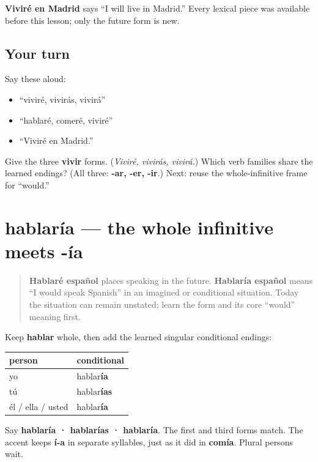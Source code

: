 \begin{grammarlens}[title={Grammar Lens: meaning with known words}]
\textbf{Viviré en Madrid} says “I will live in Madrid.” Every lexical piece was available before this lesson; only the future form is new.
\end{grammarlens}

\subsection*{Your turn}
Say these aloud:

\begin{itemize}
\raggedright
  \item “viviré, vivirás, vivirá”
  \item “hablaré, comeré, viviré”
  \item “Viviré en Madrid.”
\end{itemize}

\begin{tcolorbox}[breakable,colback=teal!4,colframe=teal!35!black,title={Before you move on}]
Give the three \textbf{vivir} forms. (\emph{Viviré, vivirás, vivirá.}) Which verb families share the learned endings? (All three: \textbf{-ar, -er, -ir}.) Next: reuse the whole-infinitive frame for “would.”
\end{tcolorbox}
\section[hablaría]{hablaría — the whole infinitive meets -ía}

\label{lesson:ES-C17-condicional}



\begin{quote}
\textbf{Hablaré español} places speaking in the future. \textbf{Hablaría español} means “I would speak Spanish” in an imagined or conditional situation. Today the situation can remain unstated; learn the form and its core “would” meaning first.
\end{quote}

\begin{grammarlens}[title={Grammar Lens: three familiar persons}]
Keep \textbf{hablar} whole, then add the learned singular conditional endings:

\noindent
\begin{tabularx}{\linewidth}{@{}>{\raggedright\arraybackslash}X>{\raggedright\arraybackslash}X@{}}
\toprule
\textbf{person} & \textbf{conditional} \\
\midrule
yo & hablar\textbf{ía} \\
tú & hablar\textbf{ías} \\
él / ella / usted & hablar\textbf{ía} \\
\bottomrule
\end{tabularx}

Say \textbf{hablaría · hablarías · hablaría}. The first and third forms match. The accent keeps \textbf{í-a} in separate syllables, just as it did in \textbf{comía}. Plural persons wait.
\end{grammarlens}

